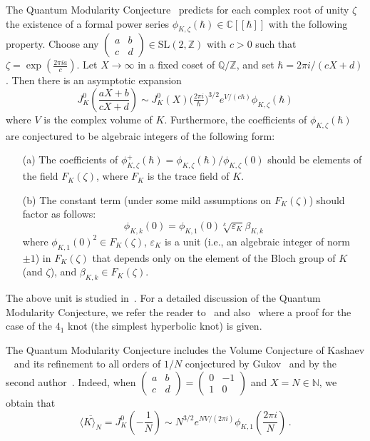 \documentclass[12pt]{amsart}
\theoremstyle{definition}
\def\BN{\mathbb N}
\def\BZ{\mathbb Z}
\def\BQ{\mathbb Q}
\def\BC{\mathbb C}
\def\la{\langle}
\def\ra{\rangle}
\def\SL{\mathrm{SL}}
\def\be{  \begin{equation} }
\def\ee{  \end{equation} }
\begin{document}
The Quantum Modularity Conjecture~\cite{Za:QMF} predicts for each 
complex root of unity $\zeta$ the existence of a formal power series 
$\phi_{K,\zeta}(\hbar) \in \BC[\![\hbar]\!]$ with the following property. 
Choose any $\begin{pmatrix} a & b \\ c & d \end{pmatrix} \in \SL(2,\BZ)$ 
with $c>0$ such that $\zeta = \exp(\frac{2\pi i a}{c})$. Let $X\to\infty$ 
in a fixed coset of $\BQ/\BZ$, and set $\hbar=2\pi i/(cX+d)$.
Then there is an asymptotic expansion
\be
\label{eq.QMF}
J^0_K\left(\frac{aX+b}{cX+d}\right) \sim J^0_K(X) 
\big(\tfrac{2\pi i}{\hbar}\big)^{3/2} e^{V/(c\hbar)}
\phi_{K,\zeta}(\hbar)
\ee
where $V$ is the complex volume of $K$. Furthermore, the coefficients of 
$\phi_{K,\zeta}(\hbar)$ 
are conjectured to be algebraic integers of the
following form:
\begin{itemize}
\item[(a)]
The coefficients of 
$\phi^+_{K,\zeta}(\hbar)=\phi_{K,\zeta}(\hbar)/\phi_{K,\zeta}(0)$ 
should be elements of the field 
$F_K(\zeta)$, where $F_K$ is the trace field of $K$. 
\item[(b)]
The constant term (under some mild assumptions on $F_K(\zeta)$)
should factor as follows:
\be
\label{eq.phi0factor}
\phi_{K,k}(0) = \phi_{K,1}(0) \sqrt[k]{\varepsilon_K} \beta_{K,k}
\ee
where $\phi_{K,1}(0)^2 \in F_K(\zeta)$, $\varepsilon_K$ is a unit (i.e.,
an algebraic integer of norm $\pm 1$)
in $F_K(\zeta)$ that depends only on the element of the Bloch group
of $K$ (and $\zeta$), and $\beta_{K,k} \in F_K(\zeta)$. 
\end{itemize}
The above unit is studied in~\cite{calegari}. For a detailed 
discussion of the Quantum Modularity Conjecture, we refer the reader 
to~\cite{Za:QMF} and also~\cite{GZ1} where a proof for the case of 
the $4_1$ knot (the simplest hyperbolic knot) is given. 

The Quantum Modularity Conjecture includes the Volume Conjecture of Kashaev
~\cite{Kashaev95} and its refinement to all orders of $1/N$ conjectured by
Gukov~\cite{Gu} and by the second author~\cite{Ga:arithmetic}. Indeed,
when $\left(\begin{smallmatrix} a & b \\ c & d \end{smallmatrix}\right)  
= \left(\begin{smallmatrix} 0 & -1 \\ 1 & 0\end{smallmatrix}\right)$
and $X=N\in \BN$, we obtain that
\be
\label{eq.GVC}
\overline{\la K \ra_N} = J^0_K\left(-\frac{1}{N}\right) \sim 
N^{3/2} e^{N V/(2 \pi i)}\phi_{K,1}\left(\frac{2 \pi i}{N}\right)\,.
\ee
\end{document}
